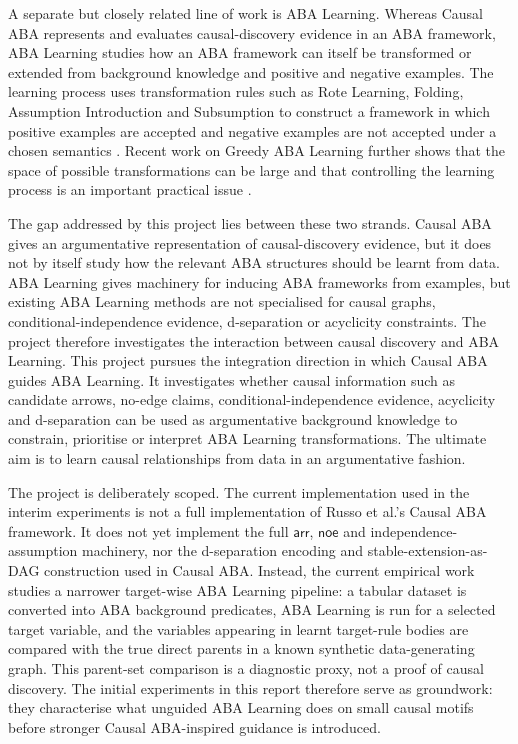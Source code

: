 A separate but closely related line of work is ABA Learning. Whereas Causal ABA represents and evaluates causal-discovery evidence in an ABA framework, ABA Learning studies how an ABA framework can itself be transformed or extended from background knowledge and positive and negative examples. The learning process uses transformation rules such as Rote Learning, Folding, Assumption Introduction and Subsumption to construct a framework in which positive examples are accepted and negative examples are not accepted under a chosen semantics \cite{proietti2022learning,de2023aba,de2024learning}. Recent work on Greedy ABA Learning further shows that the space of possible transformations can be large and that controlling the learning process is an important practical issue \cite{de2025greedy}.

The gap addressed by this project lies between these two strands. Causal ABA gives an argumentative representation of causal-discovery evidence, but it does not by itself study how the relevant ABA structures should be learnt from data. ABA Learning gives machinery for inducing ABA frameworks from examples, but existing ABA Learning methods are not specialised for causal graphs, conditional-independence evidence, d-separation or acyclicity constraints. The project therefore investigates the interaction between causal discovery and ABA Learning. This project pursues the integration direction in which Causal ABA guides ABA Learning. It investigates whether causal information such as candidate arrows, no-edge claims, conditional-independence evidence, acyclicity and d-separation can be used as argumentative background knowledge to constrain, prioritise or interpret ABA Learning transformations. The ultimate aim is to learn causal relationships from data in an argumentative fashion.

The project is deliberately scoped. The current implementation used in the interim experiments is not a full implementation of Russo et al.'s Causal ABA framework. It does not yet implement the full \(\mathsf{arr}\), \(\mathsf{noe}\) and independence-assumption machinery, nor the d-separation encoding and stable-extension-as-DAG construction used in Causal ABA. Instead, the current empirical work studies a narrower target-wise ABA Learning pipeline: a tabular dataset is converted into ABA background predicates, ABA Learning is run for a selected target variable, and the variables appearing in learnt target-rule bodies are compared with the true direct parents in a known synthetic data-generating graph. This parent-set comparison is a diagnostic proxy, not a proof of causal discovery. The initial experiments in this report therefore serve as groundwork: they characterise what unguided ABA Learning does on small causal motifs before stronger Causal ABA-inspired guidance is introduced.

